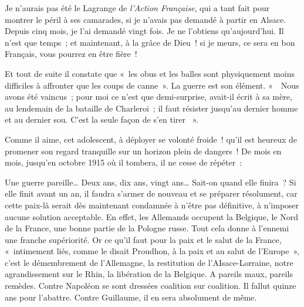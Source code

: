 \documentclass[french,twoside]{book} %
\newenvironment{quoteblock}%
  {\begin{quoting}}
  {\end{quoting}}
\newenvironment{quotebar}{%
    \def\FrameCommand{{\color{rubric!10!}\vrule width 0.5em} \hspace{0.9em}}%
    \def\OuterFrameSep{\itemsep} %
    \MakeFramed {\advance\hsize-\width \FrameRestore}
  }%
  {%
    \endMakeFramed
  }
\renewenvironment{quoteblock}%
  {%
    \savenotes
    \setstretch{0.9}
    \normalfont
    \begin{quotebar}
  }
  {%
    \end{quotebar}
    \spewnotes
  }
\begin{document}
\begin{quoteblock}
 \noindent Je n’aurais pas été le Lagrange de {\itshape l’Action Française}, qui a tant fait pour montrer le péril à ses camarades, si je n’avais pas demandé à partir en Alsace. Depuis cinq mois, je l’ai demandé vingt fois. Je ne l’obtiens qu’aujourd’hui. Il n’est que temps ; et maintenant, à la grâce de Dieu ! si je meurs, ce sera en bon Français, vous pourrez en être fière !‌
 \end{quoteblock}

\noindent Et tout de suite il constate que « les obus et les balles sont physiquement moins difficiles à affronter que les coups de canne ». La guerre est son élément. «  Nous avons été vaincus ; pour moi ce n’est que demi-surprise, avait-il écrit à sa mère, au lendemain de la bataille de Charleroi ; il faut résister jusqu’au dernier homme et au dernier sou. C’est la seule façon de s’en tirer  ».‌\par
Comme il aime, cet adolescent, à déployer se volonté froide ! qu’il est heureux de promener son regard tranquille sur un horizon plein de dangers ! De mois en mois, jusqu’en octobre 1915 où il tombera, il ne cesse de répéter :‌\par

\begin{quoteblock}
 \noindent Une guerre pareille… Deux ans, dix ans, vingt ans… Sait-on quand elle finira ? Si elle finit avant un an, il faudra s’armer de nouveau et se préparer résolument, car cette paix-là serait dès maintenant condamnée à n’être pas définitive, à n’imposer aucune solution acceptable. En effet, les Allemands occupent la Belgique, le Nord de la France, une bonne partie de la Pologne russe. Tout cela donne à l’ennemi une franche supériorité. Or ce qu’il faut pour la paix et le salut de la France, « intimement liés, comme le disait Proudhon, à la paix et au salut de l’Europe », c’est le démembrement de l’Allemagne, la restitution de l’AIsace-Lorraine, notre agrandissement sur le Rhin, la libération de la Belgique. A pareils maux, pareils remèdes. Contre Napoléon se sont dressées coalition sur coalition. Il fallut quinze ans pour l’abattre. Contre Guillaume, il en sera absolument de même.‌
 \end{quoteblock}
\end{document}
